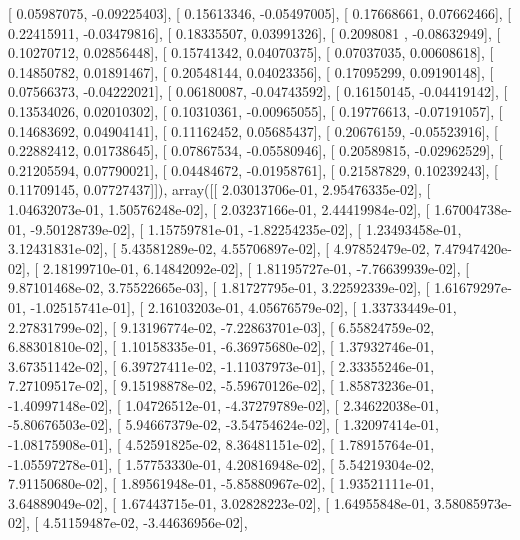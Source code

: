 \documentclass{article}
\begin{document}
       [ 0.05987075, -0.09225403],
       [ 0.15613346, -0.05497005],
       [ 0.17668661,  0.07662466],
       [ 0.22415911, -0.03479816],
       [ 0.18335507,  0.03991326],
       [ 0.2098081 , -0.08632949],
       [ 0.10270712,  0.02856448],
       [ 0.15741342,  0.04070375],
       [ 0.07037035,  0.00608618],
       [ 0.14850782,  0.01891467],
       [ 0.20548144,  0.04023356],
       [ 0.17095299,  0.09190148],
       [ 0.07566373, -0.04222021],
       [ 0.06180087, -0.04743592],
       [ 0.16150145, -0.04419142],
       [ 0.13534026,  0.02010302],
       [ 0.10310361, -0.00965055],
       [ 0.19776613, -0.07191057],
       [ 0.14683692,  0.04904141],
       [ 0.11162452,  0.05685437],
       [ 0.20676159, -0.05523916],
       [ 0.22882412,  0.01738645],
       [ 0.07867534, -0.05580946],
       [ 0.20589815, -0.02962529],
       [ 0.21205594,  0.07790021],
       [ 0.04484672, -0.01958761],
       [ 0.21587829,  0.10239243],
       [ 0.11709145,  0.07727437]]), array([[  2.03013706e-01,   2.95476335e-02],
       [  1.04632073e-01,   1.50576248e-02],
       [  2.03237166e-01,   2.44419984e-02],
       [  1.67004738e-01,  -9.50128739e-02],
       [  1.15759781e-01,  -1.82254235e-02],
       [  1.23493458e-01,   3.12431831e-02],
       [  5.43581289e-02,   4.55706897e-02],
       [  4.97852479e-02,   7.47947420e-02],
       [  2.18199710e-01,   6.14842092e-02],
       [  1.81195727e-01,  -7.76639939e-02],
       [  9.87101468e-02,   3.75522665e-03],
       [  1.81727795e-01,   3.22592339e-02],
       [  1.61679297e-01,  -1.02515741e-01],
       [  2.16103203e-01,   4.05676579e-02],
       [  1.33733449e-01,   2.27831799e-02],
       [  9.13196774e-02,  -7.22863701e-03],
       [  6.55824759e-02,   6.88301810e-02],
       [  1.10158335e-01,  -6.36975680e-02],
       [  1.37932746e-01,   3.67351142e-02],
       [  6.39727411e-02,  -1.11037973e-01],
       [  2.33355246e-01,   7.27109517e-02],
       [  9.15198878e-02,  -5.59670126e-02],
       [  1.85873236e-01,  -1.40997148e-02],
       [  1.04726512e-01,  -4.37279789e-02],
       [  2.34622038e-01,  -5.80676503e-02],
       [  5.94667379e-02,  -3.54754624e-02],
       [  1.32097414e-01,  -1.08175908e-01],
       [  4.52591825e-02,   8.36481151e-02],
       [  1.78915764e-01,  -1.05597278e-01],
       [  1.57753330e-01,   4.20816948e-02],
       [  5.54219304e-02,   7.91150680e-02],
       [  1.89561948e-01,  -5.85880967e-02],
       [  1.93521111e-01,   3.64889049e-02],
       [  1.67443715e-01,   3.02828223e-02],
       [  1.64955848e-01,   3.58085973e-02],
       [  4.51159487e-02,  -3.44636956e-02],
\end{document}

